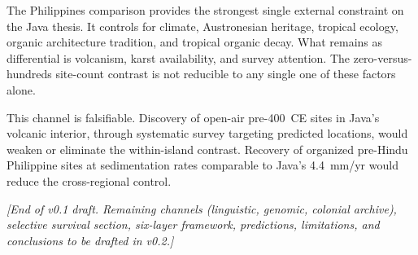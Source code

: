 \documentclass[12pt,a4paper]{article}
\begin{document}
The Philippines comparison provides the strongest single external constraint on the Java thesis. It controls for climate, Austronesian heritage, tropical ecology, organic architecture tradition, and tropical organic decay. What remains as differential is volcanism, karst availability, and survey attention. The zero-versus-hundreds site-count contrast is not reducible to any single one of these factors alone.

This channel is falsifiable. Discovery of open-air pre-400~CE sites in Java's volcanic interior, through systematic survey targeting predicted locations, would weaken or eliminate the within-island contrast. Recovery of organized pre-Hindu Philippine sites at sedimentation rates comparable to Java's 4.4~mm/yr would reduce the cross-regional control.



\vspace{1em}
\noindent\textit{[End of v0.1 draft. Remaining channels (linguistic, genomic, colonial archive), selective survival section, six-layer framework, predictions, limitations, and conclusions to be drafted in v0.2.]}



\end{document}
